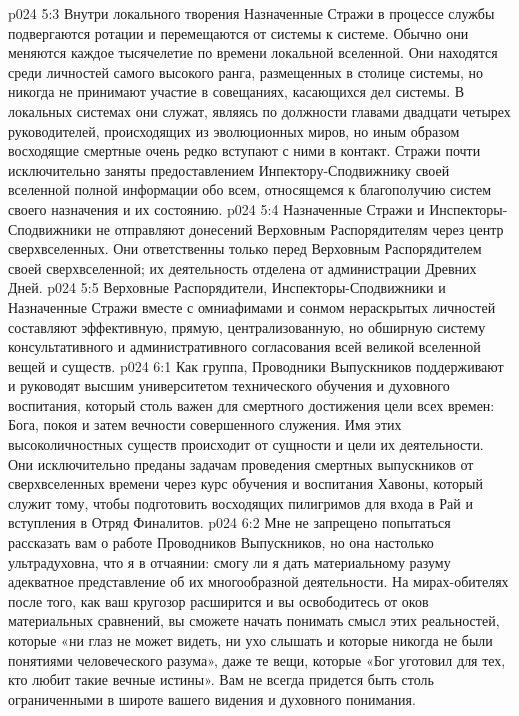 \vs p024 5:3 Внутри локального творения Назначенные Стражи в процессе службы подвергаются ротации и перемещаются от системы к системе. Обычно они меняются каждое тысячелетие по времени локальной вселенной. Они находятся среди личностей самого высокого ранга, размещенных в столице системы, но никогда не принимают участие в совещаниях, касающихся дел системы. В локальных системах они служат, являясь по должности главами двадцати четырех руководителей, происходящих из эволюционных миров, но иным образом восходящие смертные очень редко вступают с ними в контакт. Стражи почти исключительно заняты предоставлением Инпектору\hyp{}Сподвижнику своей вселенной полной информации обо всем, относящемся к благополучию систем своего назначения и их состоянию.
\vs p024 5:4 Назначенные Стражи и Инспекторы\hyp{}Сподвижники не отправляют донесений Верховным Распорядителям через центр сверхвселенных. Они ответственны только перед Верховным Распорядителем своей сверхвселенной; их деятельность отделена от администрации Древних Дней.
\vs p024 5:5 \pc Верховные Распорядители, Инспекторы\hyp{}Сподвижники и Назначенные Стражи вместе с омниафимами и сонмом нераскрытых личностей составляют эффективную, прямую, централизованную, но обширную систему консультативного и административного согласования всей великой вселенной вещей и существ.
\vs p024 6:1 Как группа, Проводники Выпускников поддерживают и руководят высшим университетом технического обучения и духовного воспитания, который столь важен для смертного достижения цели всех времен: Бога, покоя и затем вечности совершенного служения. Имя этих высоколичностных существ происходит от сущности и цели их деятельности. Они исключительно преданы задачам проведения смертных выпускников от сверхвселенных времени через курс обучения и воспитания Хавоны, который служит тому, чтобы подготовить восходящих пилигримов для входа в Рай и вступления в Отряд Финалитов.
\vs p024 6:2 Мне не запрещено попытаться рассказать вам о работе Проводников Выпускников, но она настолько ультрадуховна, что я в отчаянии: смогу ли я дать материальному разуму адекватное представление об их многообразной деятельности. На мирах\hyp{}обителях после того, как ваш кругозор расширится и вы освободитесь от оков материальных сравнений, вы сможете начать понимать смысл этих реальностей, которые «ни глаз не может видеть, ни ухо слышать и которые никогда не были понятиями человеческого разума», даже те вещи, которые «Бог уготовил для тех, кто любит такие вечные истины». Вам не всегда придется быть столь ограниченными в широте вашего видения и духовного понимания.
